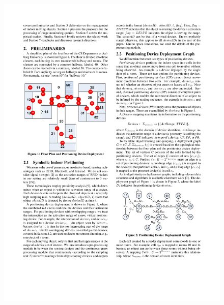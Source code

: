 \begin{frame}
\begin{columns}[c]
\begin{figure}[tb]
      \includegraphics[width=\columnwidth]{figures/2-2/2-2-2.pdf}
    \end{figure}

\end{columns}

\end{frame}


